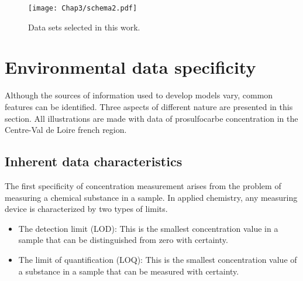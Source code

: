 \begin{figure}[ht]
    \centering
    \texttt{[image: Chap3/schema2.pdf]}
    \caption{Data sets selected in this work.}
    \label{fig:compartments_choice}
\end{figure}


\section{Environmental data specificity}

Although the sources of information used to develop models vary, common features can be identified. Three aspects of different nature are presented in this section. All illustrations are made with data of prosulfocarbe concentration in the Centre-Val de Loire french region. 

\subsection{Inherent data characteristics}

The first specificity of concentration measurement arises from the problem of measuring a chemical substance in a sample. In applied chemistry, any measuring device is characterized by two types of limits. 

\begin{itemize}
    \item The detection limit (LOD): This is the smallest concentration value in a sample that can be distinguished from zero with certainty.
    \item The limit of quantification (LOQ): This is the smallest concentration value of a substance in a sample that can be measured with certainty. 
\end{itemize}

